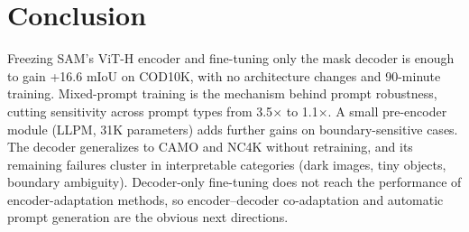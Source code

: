 \section{Conclusion}

Freezing SAM's ViT-H encoder and fine-tuning only the mask decoder is enough to gain +16.6 mIoU on COD10K, with no architecture changes and 90-minute training. Mixed-prompt training is the mechanism behind prompt robustness, cutting sensitivity across prompt types from 3.5$\times$ to 1.1$\times$. A small pre-encoder module (LLPM, 31K parameters) adds further gains on boundary-sensitive cases. The decoder generalizes to CAMO and NC4K without retraining, and its remaining failures cluster in interpretable categories (dark images, tiny objects, boundary ambiguity). Decoder-only fine-tuning does not reach the performance of encoder-adaptation methods, so encoder--decoder co-adaptation and automatic prompt generation are the obvious next directions.
